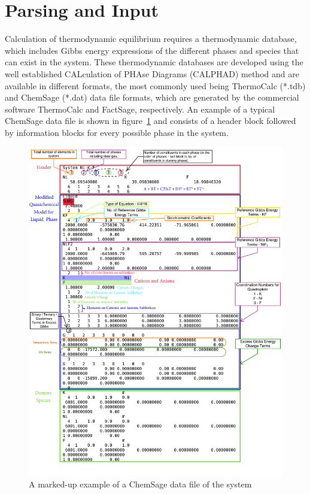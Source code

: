 \section{Parsing and Input}
	Calculation of thermodynamic equilibrium requires a thermodynamic database, which includes Gibbs energy expressions of the different phases and species that can exist in the system. These thermodynamic databases are developed using the well established CALculation of PHAse Diagrams (CALPHAD) method \cite{liu_wang_2016} and are available in different formats, the most commonly used being ThermoCalc (*.tdb) and ChemSage (*.dat) data file formats, which are generated by the commercial software ThermoCalc and FactSage, respectively. An example of a typical ChemSage data file is shown in figure~\ref{fig:datfile} and consists of a header block followed by information blocks for every possible phase in the system.
	\begin{figure}[htbp]
	 	\centering
	   	\includegraphics[width=\textwidth]{figures/NiKF.pdf}
	   	\caption{A marked-up example of a ChemSage data file of the  system \cite{OcadizFlores18}}
	   	\label{fig:datfile}
	\end{figure}

